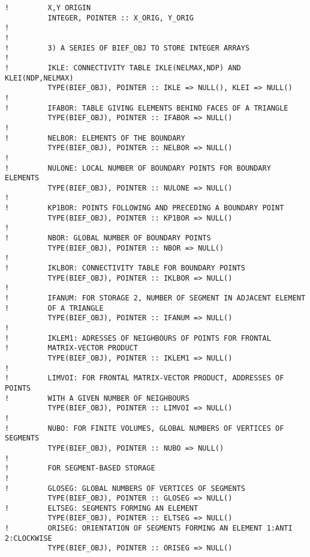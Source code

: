 \begin{lstlisting}[language=TelFortran]
!         X,Y ORIGIN
          INTEGER, POINTER :: X_ORIG, Y_ORIG
!
!
!         3) A SERIES OF BIEF_OBJ TO STORE INTEGER ARRAYS
!
!         IKLE: CONNECTIVITY TABLE IKLE(NELMAX,NDP) AND KLEI(NDP,NELMAX)
          TYPE(BIEF_OBJ), POINTER :: IKLE => NULL(), KLEI => NULL()
!
!         IFABOR: TABLE GIVING ELEMENTS BEHIND FACES OF A TRIANGLE
          TYPE(BIEF_OBJ), POINTER :: IFABOR => NULL()
!
!         NELBOR: ELEMENTS OF THE BOUNDARY
          TYPE(BIEF_OBJ), POINTER :: NELBOR => NULL()
!
!         NULONE: LOCAL NUMBER OF BOUNDARY POINTS FOR BOUNDARY ELEMENTS
          TYPE(BIEF_OBJ), POINTER :: NULONE => NULL()
!
!         KP1BOR: POINTS FOLLOWING AND PRECEDING A BOUNDARY POINT
          TYPE(BIEF_OBJ), POINTER :: KP1BOR => NULL()
!
!         NBOR: GLOBAL NUMBER OF BOUNDARY POINTS
          TYPE(BIEF_OBJ), POINTER :: NBOR => NULL()
!
!         IKLBOR: CONNECTIVITY TABLE FOR BOUNDARY POINTS
          TYPE(BIEF_OBJ), POINTER :: IKLBOR => NULL()
!
!         IFANUM: FOR STORAGE 2, NUMBER OF SEGMENT IN ADJACENT ELEMENT
!         OF A TRIANGLE
          TYPE(BIEF_OBJ), POINTER :: IFANUM => NULL()
!
!         IKLEM1: ADRESSES OF NEIGHBOURS OF POINTS FOR FRONTAL
!         MATRIX-VECTOR PRODUCT
          TYPE(BIEF_OBJ), POINTER :: IKLEM1 => NULL()
!
!         LIMVOI: FOR FRONTAL MATRIX-VECTOR PRODUCT, ADDRESSES OF POINTS
!         WITH A GIVEN NUMBER OF NEIGHBOURS
          TYPE(BIEF_OBJ), POINTER :: LIMVOI => NULL()
!
!         NUBO: FOR FINITE VOLUMES, GLOBAL NUMBERS OF VERTICES OF SEGMENTS
          TYPE(BIEF_OBJ), POINTER :: NUBO => NULL()
!
!         FOR SEGMENT-BASED STORAGE
!
!         GLOSEG: GLOBAL NUMBERS OF VERTICES OF SEGMENTS
          TYPE(BIEF_OBJ), POINTER :: GLOSEG => NULL()
!         ELTSEG: SEGMENTS FORMING AN ELEMENT
          TYPE(BIEF_OBJ), POINTER :: ELTSEG => NULL()
!         ORISEG: ORIENTATION OF SEGMENTS FORMING AN ELEMENT 1:ANTI 2:CLOCKWISE
          TYPE(BIEF_OBJ), POINTER :: ORISEG => NULL()


\end{lstlisting}
